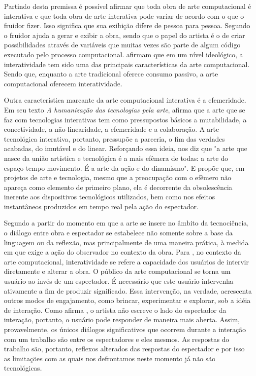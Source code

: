 Partindo desta premissa é possível afirmar que toda obra de arte computacional é interativa e que toda obra de arte interativa pode variar de acordo com o que o fruidor fizer. Isso significa que sua exibição difere de pessoa para pessoa. Segundo  o fruidor ajuda a gerar e exibir a obra, sendo que o papel do artista é o de criar possibilidades através de variáveis que muitas vezes são parte de algum código executado pelo processo computacional.  afirmam que em um nível ideológico, a interatividade tem sido uma das principais características da arte computacional. Sendo que, enquanto a arte tradicional oferece consumo passivo, a arte computacional oferecem interatividade.

Outra característica marcante da arte computacional interativa é a efemeridade. Em seu texto \textit{A humanização das tecnologias pela arte},  afirma que a arte que se faz com tecnologias interativas tem como pressupostos básicos a mutabilidade, a conectividade, a não-linearidade, a efemeridade e a colaboração. A arte tecnológica interativa, portanto, pressupõe a parceria, o fim das verdades acabadas, do imutável e do linear. Reforçando essa ideia,  nos diz que "a arte que nasce da união artística e tecnológica é a mais efêmera de todas: a arte do espaço-tempo-movimento. É a arte da ação e do dinamismo". E  propõe que, em projetos de arte e tecnologia, mesmo que a preocupação com o efêmero não apareça como elemento de primeiro plano, ela é decorrente da obsolescência inerente aos dispositivos tecnológicos utilizados, bem como nos efeitos instantâneos produzidos em tempo real pela ação do espectador.

Segundo  a partir do momento em que a arte se insere no âmbito da tecnociência, o diálogo entre obra e espectador se estabelece não somente sobre a base da linguagem ou da reflexão, mas principalmente de uma maneira prática, à medida em que exige a ação do observador no contexto da obra. Para , no contexto da arte computacional, interatividade se refere a capacidade dos usuários de intervir diretamente e alterar a obra. O público da arte computacional se torna um usuário ao invés de um espectador. É necessário que este usuário intervenha ativamente a fim de produzir significado. Essa intervenção, na verdade, acrescenta outros modos de engajamento, como brincar, experimentar e explorar, sob a idéia de interação. Como afirma , o artista não escreve o lado do espectador da interação, portanto, o usuário pode responder de maneira mais aberta. Assim, provavelmente, os únicos diálogos significativos que ocorrem durante a interação com um trabalho são entre os espectadores e eles mesmos. As respostas do trabalho são, portanto, reflexos alterados das respostas do espectador e por isso as limitações com as quais nos defrontamos neste momento já não são tecnológicas.


